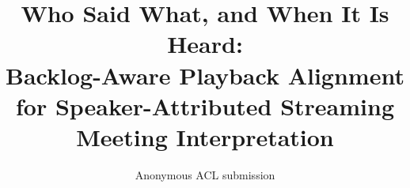 \documentclass[11pt]{article}
\title{Who Said What, and When It Is Heard:\\
Backlog-Aware Playback Alignment for Speaker-Attributed Streaming Meeting Interpretation}
\author{Anonymous ACL submission}
\begin{document}
\maketitle












\appendix
\makeatletter
\renewcommand{\thesection}{\ifnum\c@section>26 A\@Alph{\numexpr\c@section-26\relax}\else\@Alph{\c@section}\fi}
\makeatother



\end{document}
